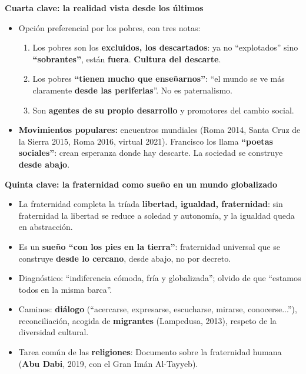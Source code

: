 \documentclass[10pt,a4paper]{article}
\begin{document}
\medskip\noindent \textbf{Cuarta clave: la realidad vista desde los últimos}\par\nopagebreak
\begin{itemize}
\item Opción preferencial por los pobres, con tres notas:
\begin{enumerate}
\item Los pobres son los \textbf{excluidos, los descartados}: ya no ``explotados'' sino \textbf{``sobrantes''}, están \textbf{fuera}. \textbf{Cultura del descarte}.
\item Los pobres \textbf{``tienen mucho que enseñarnos''}: ``el mundo se ve más claramente \textbf{desde las periferias}''. No es paternalismo.
\item Son \textbf{agentes de su propio desarrollo} y promotores del cambio social.
\end{enumerate}
\item \textbf{Movimientos populares:} encuentros mundiales (Roma 2014, Santa Cruz de la Sierra 2015, Roma 2016, virtual 2021). Francisco los llama \textbf{``poetas sociales''}: crean esperanza donde hay descarte. La sociedad se construye \textbf{desde abajo}.
\end{itemize}

\medskip\noindent \textbf{Quinta clave: la fraternidad como sueño en un mundo globalizado}\par\nopagebreak
\begin{itemize}
\item La fraternidad completa la tríada \textbf{libertad, igualdad, fraternidad}: sin fraternidad la libertad se reduce a soledad y autonomía, y la igualdad queda en abstracción.
\item Es un \textbf{sueño ``con los pies en la tierra''}: fraternidad universal que se construye \textbf{desde lo cercano}, desde abajo, no por decreto.
\item Diagnóstico: ``indiferencia cómoda, fría y globalizada''; olvido de que ``estamos todos en la misma barca''.
\item Caminos: \textbf{diálogo} (``acercarse, expresarse, escucharse, mirarse, conocerse...''), reconciliación, acogida de \textbf{migrantes} (Lampedusa, 2013), respeto de la diversidad cultural.
\item Tarea común de las \textbf{religiones}: Documento sobre la fraternidad humana (\textbf{Abu Dabi}, 2019, con el Gran Imán Al-Tayyeb).
\end{itemize}
\end{document}
